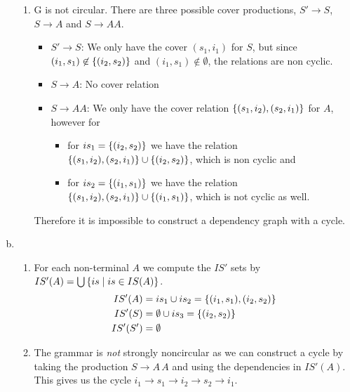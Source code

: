 \begin{solution}
\begin{enumerate}[(a)]
\begin{enumerate}[1.]
\item G is not circular.
    There are three possible cover productions, $S' \rightarrow S$, $S \rightarrow A$ and $S \rightarrow AA$.
    \begin{itemize}
    \item $S' \rightarrow S$: We only have the cover $(s_1, i_1)$ for $S$, but since $(i_1, s_1) \not \in \left\{ (i_2, s_2) \right\}$ and $(i_1, s_1) \not \in \emptyset$, the relations are non cyclic.
    \item $S \rightarrow A$: No cover relation
    \item $S \rightarrow AA$: We only have the cover relation $\left\{ (s_1, i_2), (s_2, i_1) \right\}$ for $A$, however for
    \begin{itemize}
        \item for $is_1 = \left\{ (i_2, s_2) \right\}$ we have the relation $\left\{ (s_1, i_2), (s_2, i_1) \right\} \cup \left\{ (i_2, s_2) \right\}$, which is non cyclic and
       \item for $is_2 = \left\{ (i_1, s_1) \right\}$ we have the relation $\left\{ (s_1, i_2), (s_2, i_1) \right\} \cup \left\{ (i_1, s_1) \right\}$, which is not cyclic as well.
    \end{itemize}
    \end{itemize}
    Therefore it is impossible to construct a dependency graph with a cycle.
\end{enumerate}

\item
\begin{enumerate}[1.]
    \item For each non-terminal $A$ we compute the $IS'$ sets by $IS'(A) = \bigcup \left\{ is \mid is \in IS(A) \right\}$.
    \begin{align*}
        IS'(A) &= is_1 \cup is_2 = \left\{ (i_1, s_1),(i_2, s_2) \right\} \\
        IS'(S) &= \emptyset \cup is_3 = \left\{ (i_2, s_2) \right\} \\
        IS'(S') &= \emptyset
    \end{align*}

    \item The grammar is \emph{not} strongly noncircular as we can construct a cycle by taking the production $S \to A\,A$ and using the dependencies in $IS'(A)$.
        This gives us the cycle $i_1 \rightarrow s_1 \rightarrow i_2 \rightarrow s_2 \rightarrow i_1$.
\end{enumerate}
\end{enumerate}
\end{solution}

